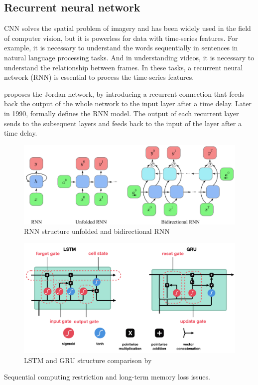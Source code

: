 \subsection{Recurrent neural network} %
CNN solves the spatial problem of imagery and has been widely used in the field of computer vision, but it is powerless for data with time-series features.
For example, it is necessary to understand the words sequentially in sentences in natural language processing tasks.
And in understanding videos, it is necessary to understand the relationship between frames.
In these tasks, a recurrent neural network (RNN) is essential to process the time-series features.

\citet{jordan1986serial} proposes the Jordan network, by introducing a recurrent connection that feeds back the output of the whole network to the input layer after a time delay. 
Later in 1990, \citet{elman1990finding} formally defines the RNN model.
The output of each recurrent layer sends to the subsequent layers and feeds back to the input of the layer after a time delay.

\begin{figure}[ht!]
    \centering
    \includegraphics[width=\textwidth]{literature/imgs/2-RNN-unfold.pdf}
    \caption{RNN structure unfolded and bidirectional RNN}
    \label{fig:2-RNN-unfold}
\end{figure}

\citet{hochreiter1997long}

\citet{sherstinsky2020fundamentals}

\citet{chung2014empirical}

\begin{figure}[ht!]
    \centering
    \includegraphics[width=.9\textwidth]{literature/imgs/ext-LSTM-GRU.png}
    \caption{LSTM and GRU structure comparison by \citet{phi2018illustrated}}
    \label{fig:ext-LSTM-GRU}
\end{figure}

Sequential computing restriction and long-term memory loss issues.